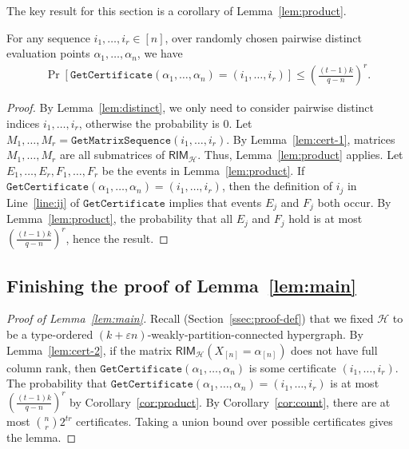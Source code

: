 \documentclass{article}[11pt]
\begin{document}
The key result for this section is a corollary of Lemma~\ref{lem:product}.
\begin{corollary}
   For any sequence $i_1,\dots,i_{r}\in[n]$, over randomly chosen pairwise distinct evaluation points $\alpha_1 , \dots , \alpha_n$, we have
   \label{cor:product}
  \begin{align}
    \Pr\left[\mathtt{GetCertificate}(\alpha_1,\dots,\alpha_n) = (i_1,\dots,i_{r})\right] 
    \le \left(\frac{(t-1)k}{q-n}\right)^{r}.
    \label{}
  \end{align}
\end{corollary}
\begin{proof}
  By Lemma~\ref{lem:distinct}, we only need to consider pairwise distinct indices $i_1,\dots,i_r$, otherwise the probability is 0.
  Let $M_1,\dots,M_r=\mathtt{GetMatrixSequence}(i_1,\dots,i_r)$.
  By Lemma~\ref{lem:cert-1}, matrices $M_1,\dots,M_r$ are all submatrices of $\mathsf{RIM}_\mathcal{H}$.
  Thus, Lemma~\ref{lem:product} applies.
  Let $E_1,\dots,E_r, F_1,\dots,F_r$ be the events in Lemma~\ref{lem:product}.
  If $\mathtt{GetCertificate}(\alpha_1,\dots,\alpha_n)=(i_1,\dots,i_r)$, then the definition of $i_j$ in Line~\ref{line:ij} of $\mathtt{GetCertificate}$ implies that events $E_j$ and $F_j$ both occur.
  By Lemma~\ref{lem:product}, the probability that all $E_j$ and $F_j$ hold is at most $(\frac{(t-1)k}{q-n})^r$, hence the result.
\end{proof}





\subsection{Finishing the proof of Lemma~\ref{lem:main}}

\begin{proof}[Proof of Lemma~\ref{lem:main}]
  Recall (Section~\ref{ssec:proof-def}) that we fixed $\mathcal{H}$ to be a type-ordered $(k+\varepsilon n)$-weakly-partition-connected hypergraph.
  By Lemma~\ref{lem:cert-2}, if the matrix $\mathsf{RIM}_\mathcal{H}(X_{[n]}=\alpha_{[n]})$ does not have full column rank, then $\mathtt{GetCertificate}(\alpha_1,\dots,\alpha_n)$ is some certificate $(i_1,\dots,i_r)$.
  The probability that $\mathtt{GetCertificate}(\alpha_1,\dots,\alpha_n) = (i_1,\dots,i_r)$ is at most $(\frac{(t-1)k}{q-n})^r$ by Corollary~\ref{cor:product}.
  By Corollary~\ref{cor:count}, there are at most $\binom{n}{r}2^{tr}$ certificates.
  Taking a union bound over possible certificates gives the lemma.
\end{proof}
\end{document}
